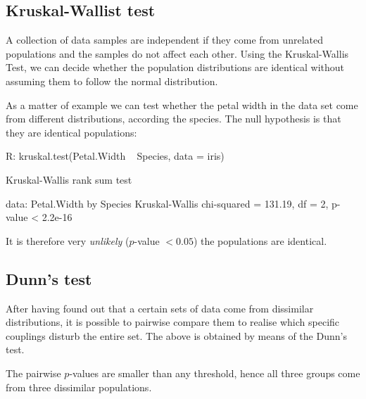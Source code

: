 \subsection{Kruskal-Wallist test}
A collection of data samples are independent 
if they come from unrelated populations and 
the samples do not affect each other. Using the 
Kruskal-Wallis Test, we can decide whether the 
population distributions are identical without 
assuming them to follow the normal distribution.
\bigskip 

As a matter of example we can test 
whether the petal width in the 
data set come from different distributions,
according the species. The null hypothesis 
is that they are identical populations:
\begin{example}
R: kruskal.test(Petal.Width ~ Species, data = iris)

	Kruskal-Wallis rank sum test

data:  Petal.Width by Species
Kruskal-Wallis chi-squared = 131.19, df = 2, p-value < 2.2e-16
\end{example}
It is therefore very \emph{unlikely} ($p$-value $<0.05$) 
the populations are identical.

\subsection{Dunn's test}

After having found out that a certain sets of data
come from dissimilar distributions, it is
possible to pairwise compare them to realise
which specific couplings disturb the entire set.
The above is obtained by means of the Dunn's test.
The pairwise $p$-values are smaller than any 
threshold, hence all three groups come from
three dissimilar populations.




